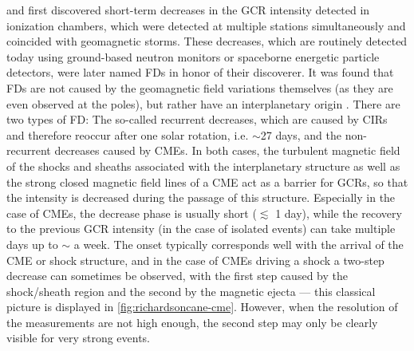 \citet{Forbush-1937} and \citet{Hess-1937} first discovered short-term decreases in the \ac{GCR} intensity detected in ionization chambers, which were detected at multiple stations simultaneously and coincided with geomagnetic storms. These decreases, which are routinely detected today using ground-based neutron monitors or spaceborne energetic particle detectors, were later named \acp{FD} in honor of their discoverer. It was found that \acp{FD} are not caused by the geomagnetic field variations themselves (as they are even observed at the poles), but rather have an interplanetary origin \citep[see e.g.][and references therein]{Lockwood1971}. There are two types of \ac{FD}: The so-called recurrent decreases, which are caused by \acp{CIR} and therefore reoccur after one solar rotation, i.e. $\sim$27 days, and the non-recurrent decreases caused by \acp{CME}. In both cases, the turbulent magnetic field of the shocks and sheaths associated with the interplanetary structure as well as the strong closed magnetic field lines of a \ac{CME} act as a barrier for \acp{GCR}, so that the intensity is decreased during the passage of this structure.
Especially in the case of \acp{CME}, the decrease phase is usually short ($\lesssim$ 1 day), while the recovery to the previous \ac{GCR} intensity (in the case of isolated events) can take multiple days up to $\sim$ a week. The onset typically corresponds well with the arrival of the \ac{CME} or shock structure, and in the case of \acp{CME} driving a shock a two-step decrease can sometimes be observed, with the first step caused by the shock/sheath region and the second by the magnetic ejecta --- this classical picture is displayed in \autoref{fig:richardsoncane-cme}. However, when the resolution of the measurements are not high enough, the second step may only be clearly visible for very strong events.
